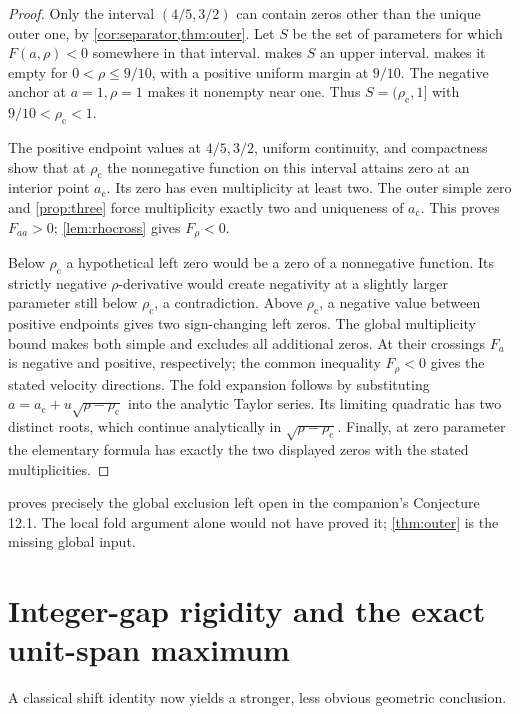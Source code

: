 \documentclass[11pt]{article}
\numberwithin{equation}{section}
\theoremstyle{definition}
\newcommand{\lc}{\rho_{\mathrm c}}
\newcommand{\ac}{a_{\mathrm c}}
\begin{document}
\begin{proof}
Only the interval $(4/5,3/2)$ can contain zeros other than the unique outer
one, by \cref{cor:separator,thm:outer}. Let $S$ be the set of parameters
for which $F(a,\rho)<0$ somewhere in that interval.
 makes $S$ an upper interval.  makes it
empty for $0<\rho\leq9/10$, with a positive uniform margin at $9/10$.
The negative anchor at $a=1,\rho=1$ makes it nonempty near one.
Thus $S=(\lc,1]$ with $9/10<\lc<1$.

The positive endpoint values at $4/5,3/2$, uniform continuity, and compactness
show that at $\lc$ the nonnegative function on this interval attains zero
at an interior point $\ac$. Its zero has even multiplicity at least two.
The outer simple zero and \cref{prop:three} force multiplicity exactly two
and uniqueness of $\ac$. This proves $F_{aa}>0$; \cref{lem:rhocross} gives
$F_\rho<0$.

Below $\lc$ a hypothetical left zero would be a zero of a nonnegative
function. Its strictly negative $\rho$-derivative would create negativity
at a slightly larger parameter still below $\lc$, a contradiction.
Above $\lc$, a negative value between positive endpoints gives two
sign-changing left zeros. The global multiplicity bound makes both
simple and excludes all additional zeros. At their crossings $F_a$ is
negative and positive, respectively; the common inequality $F_\rho<0$
gives the stated velocity directions. The fold expansion follows by
substituting $a=\ac+u\sqrt{\rho-\lc}$ into the analytic Taylor series.
Its limiting quadratic has two distinct roots, which continue analytically
in $\sqrt{\rho-\lc}$. Finally, at zero parameter the elementary formula
has exactly the two displayed zeros with the stated multiplicities.
\end{proof}

 proves precisely the global exclusion left open in the
companion's Conjecture 12.1. The local fold argument alone would not have
proved it; \cref{thm:outer} is the missing global input.

\section{Integer-gap rigidity and the exact unit-span maximum}
\label{sec:rigidity}
A classical shift identity now yields a stronger, less obvious geometric
conclusion.
\end{document}
